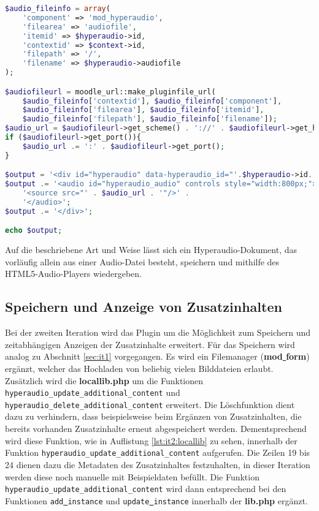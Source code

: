 \begin{lstlisting}[language=php,
             linewidth=\textwidth,
             caption={Ausschnitt der \textbf{renderer.php} in der 1. Iteration},
             label={lst:it1:renderer}]
$audio_fileinfo = array(
    'component' => 'mod_hyperaudio',
    'filearea' => 'audiofile',
    'itemid' => $hyperaudio->id,
    'contextid' => $context->id,
    'filepath' => '/',
    'filename' => $hyperaudio->audiofile
);

$audiofileurl = moodle_url::make_pluginfile_url(
    $audio_fileinfo['contextid'], $audio_fileinfo['component'],
    $audio_fileinfo['filearea'], $audio_fileinfo['itemid'],
    $audio_fileinfo['filepath'], $audio_fileinfo['filename']);
$audio_url = $audiofileurl->get_scheme() . '://' . $audiofileurl->get_host() . $audiofileurl->get_path();
if ($audiofileurl->get_port()){
    $audio_url .= ':' . $audiofileurl->get_port();
}

$output = '<div id="hyperaudio" data-hyperaudio_id="'.$hyperaudio->id.'">';
$output .= '<audio id="hyperaudio_audio" controls style="width:800px;">' .
    '<source src="' . $audio_url . '"/>' .
    '</audio>';
$output .= '</div>';

echo $output;
\end{lstlisting}

Auf die beschriebene Art und Weise lässt sich ein Hyperaudio-Dokument, das vorläufig allein aus einer Audio-Datei besteht, speichern und mithilfe des HTML5-Audio-Players wiedergeben.


\subsection{Speichern und Anzeige von Zusatzinhalten}
Bei der zweiten Iteration wird das Plugin um die Möglichkeit zum Speichern und zeitabhängigen Anzeigen der Zusatzinhalte erweitert. Für das Speichern wird analog zu Abschnitt \ref{sec:it1} vorgegangen. Es wird ein Filemanager (\textbf{mod\underline{{ }}form}) ergänzt, welcher das Hochladen von beliebig vielen Bilddateien erlaubt. Zusätzlich wird die \textbf{locallib.php} um die Funktionen \mbox{\texttt{hyperaudio_update_additional_content}} und \mbox{\texttt{hyperaudio_delete_additional_content}} erweitert. Die Löschfunktion dient dazu zu verhindern, dass beispielsweise beim Ergänzen von Zusatzinhalten, die bereits vorhanden Zusatzinhalte erneut abgespeichert werden. Dementsprechend wird diese Funktion, wie in Auflistung \ref{lst:it2:locallib} zu sehen, innerhalb der Funktion \mbox{\texttt{hyperaudio_update_additional_content}} aufgerufen. Die Zeilen 19 bis 24 dienen dazu die Metadaten des Zusatzinhaltes festzuhalten, in dieser Iteration werden diese noch manuelle mit Beispieldaten befüllt. Die Funktion \mbox{\texttt{hyperaudio_update_additional_content}} wird dann entsprechend bei den Funktionen \texttt{add\underline{{ }}instance} und \texttt{update\underline{{ }}instance} innerhalb der \textbf{lib.php} ergänzt.

